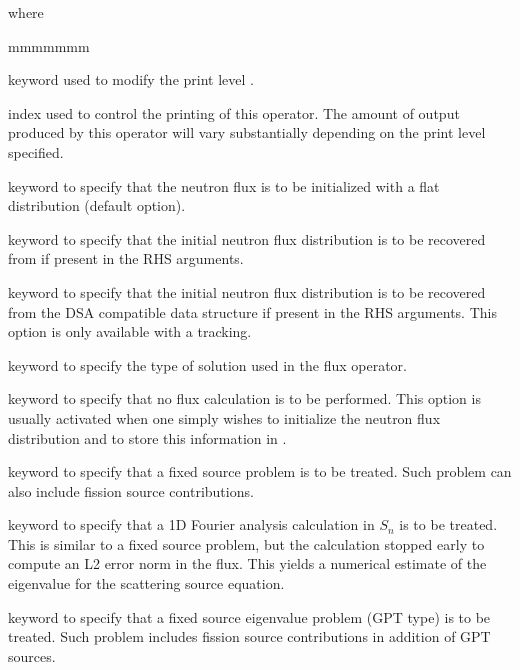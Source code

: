 \goodbreak
\noindent where
\begin{ListeDeDescription}{mmmmmmm}

\item[\moc{EDIT}] keyword used to modify the print level .

\item[\dusa{iprint}] index used to control the printing of this operator. The
amount of output produced by this operator will vary substantially
depending on the print level specified. 

\item[\moc{OFF}] keyword to specify that the neutron flux
is to be initialized with a flat distribution (default option).

\item[\moc{ON}] keyword to specify that the initial neutron flux distribution
is to be recovered from  if present in the RHS arguments.

\item[\moc{DSA}] keyword to specify that the initial neutron flux distribution
is to be recovered from the DSA compatible data structure  if present in the RHS arguments.
This option is only available with a  tracking.

\item[\moc{TYPE}] keyword to specify the type of solution used in the flux
operator.

\item[\moc{N}] keyword to specify that no flux calculation is to be performed.
This option is usually activated when one simply wishes to initialize the
neutron flux distribution and to store this information in .

\item[\moc{S}]  keyword to specify that a fixed source problem is to be
treated. Such problem can also include fission source contributions.

\item[\moc{F}] keyword to specify that a 1D Fourier analysis calculation in $S_n$ is to be treated. This is similar to a fixed source problem, but the calculation stopped early to compute an L2 error norm in the flux. This yields a numerical estimate of the eigenvalue for the scattering source equation.

\item[\moc{P}]  keyword to specify that a fixed source eigenvalue problem (GPT type) is to be
treated. Such problem includes fission source contributions in addition of GPT sources.


\end{ListeDeDescription}
